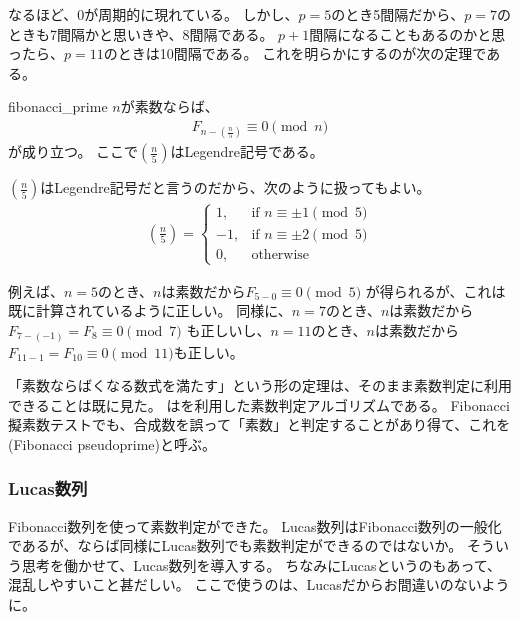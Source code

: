 なるほど、0が周期的に現れている。
しかし、$p=5$のとき5間隔だから、$p=7$のときも7間隔かと思いきや、8間隔である。
$p+1$間隔になることもあるのかと思ったら、$p=11$のときは10間隔である。
これを明らかにするのが次の定理である。

\begin{Theo}{}{fibonacci_prime}
$n$が素数ならば、
\begin{align*}
F_{n - \left(\frac{n}{5}\right)} \equiv 0 \pmod{n}
\end{align*}
が成り立つ。
ここで$\left(\frac{n}{5}\right)$はLegendre記号である。
\end{Theo}

$\left(\frac{n}{5}\right)$はLegendre記号だと言うのだから、次のように扱ってもよい。
\begin{align*}
\left(\frac{n}{5}\right) =
\begin{cases}
1, &\mbox{if }n \equiv \pm 1 \pmod{5}\\
-1, &\mbox{if }n \equiv \pm 2 \pmod{5}\\
0, &\mbox{otherwise}
\end{cases}
\end{align*}

例えば、$n=5$のとき、$n$は素数だから$F_{5 - 0} \equiv 0 \pmod{5}$
が得られるが、これは既に計算されているように正しい。
同様に、$n=7$のとき、$n$は素数だから
$F_{7 - (-1)} = F_{8} \equiv 0 \pmod{7}$
も正しいし、$n=11$のとき、$n$は素数だから
$F_{11 - 1} = F_{10} \equiv 0 \pmod{11}$も正しい。

「素数ならばくなる数式を満たす」という形の定理は、そのまま素数判定に利用できることは既に見た。
はを利用した素数判定アルゴリズムである。
Fibonacci擬素数テストでも、合成数を誤って「素数」と判定することがあり得て、これを(Fibonacci pseudoprime)と呼ぶ。

\subsubsection{Lucas数列}
Fibonacci数列を使って素数判定ができた。
Lucas数列はFibonacci数列の一般化であるが、ならば同様にLucas数列でも素数判定ができるのではないか。
そういう思考を働かせて、Lucas数列を導入する。
ちなみにLucasというのもあって、混乱しやすいこと甚だしい。
ここで使うのは、Lucasだからお間違いのないように。

